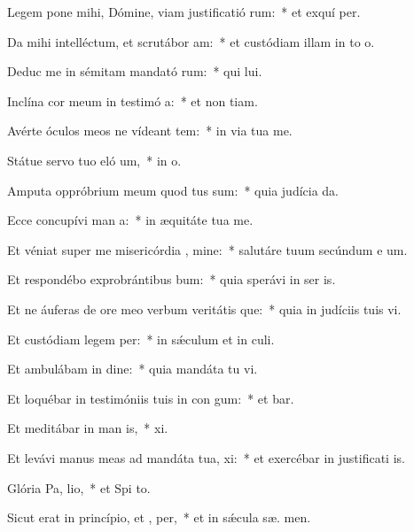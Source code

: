 \item Legem pone mihi, Dómine, viam justificatió rum:~* et exquí  per.
\item Da mihi intelléctum, et scrutábor  am:~* et custódiam illam in to  o.
\item Deduc me in sémitam mandató rum:~* qui  lui.
\item Inclína cor meum in testimó a:~* et non  tiam.
\item Avérte óculos meos ne vídeant tem:~* in via tua  me.
\item Státue servo tuo eló um,~* in  o.
\item Amputa oppróbrium meum quod tus sum:~* quia judícia  da.
\item Ecce concupívi man a:~* in æquitáte tua  me.
\item Et véniat super me misericórdia , mine:~* salutáre tuum secúndum e um.
\item Et respondébo exprobrántibus  bum:~* quia sperávi in ser is.
\item Et ne áuferas de ore meo verbum veritátis que:~* quia in judíciis tuis vi.
\item Et custódiam legem  per:~* in sǽculum et in  culi.
\item Et ambulábam in dine:~* quia mandáta tu vi.
\item Et loquébar in testimóniis tuis in con gum:~* et  bar.
\item Et meditábar in man is,~*  xi.
\item Et levávi manus meas ad mandáta tua,  xi:~* et exercébar in justificati is.
\item Glória Pa,  lio,~* et Spi to.
\item Sicut erat in princípio, et ,  per,~* et in sǽcula sæ. men.
